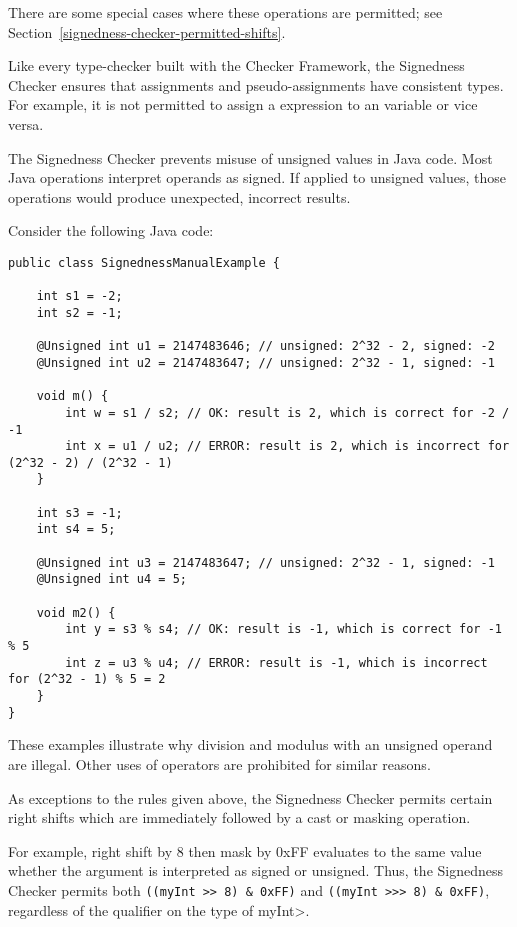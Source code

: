There are some special cases where these operations are permitted; see
Section~\ref{signedness-checker-permitted-shifts}.

Like every type-checker built with the Checker Framework, the Signedness
Checker ensures that assignments and pseudo-assignments have consistent types.
For example, it is not permitted to assign a  expression to an
 variable or vice versa.



The Signedness Checker prevents misuse of unsigned values in Java code.
Most Java operations interpret operands as signed.  If applied to unsigned
values, those operations would produce unexpected, incorrect results.

Consider the following Java code:

\begin{Verbatim}
public class SignednessManualExample {

    int s1 = -2;
    int s2 = -1;

    @Unsigned int u1 = 2147483646; // unsigned: 2^32 - 2, signed: -2
    @Unsigned int u2 = 2147483647; // unsigned: 2^32 - 1, signed: -1

    void m() {
        int w = s1 / s2; // OK: result is 2, which is correct for -2 / -1
        int x = u1 / u2; // ERROR: result is 2, which is incorrect for (2^32 - 2) / (2^32 - 1)
    }

    int s3 = -1;
    int s4 = 5;

    @Unsigned int u3 = 2147483647; // unsigned: 2^32 - 1, signed: -1
    @Unsigned int u4 = 5;

    void m2() {
        int y = s3 % s4; // OK: result is -1, which is correct for -1 % 5
        int z = u3 % u4; // ERROR: result is -1, which is incorrect for (2^32 - 1) % 5 = 2
    }
}
\end{Verbatim}

These examples illustrate why division and modulus with an unsigned operand
are illegal.  Other uses of operators are prohibited for similar reasons.



As exceptions to the rules given above, the Signedness Checker permits
certain right shifts which are immediately followed by a cast or
masking operation.

For example, right shift by 8 then mask by 0xFF evaluates to the same value
whether the argument is interpreted as signed or unsigned.  Thus, the
Signedness Checker permits both \verb|((myInt >> 8) & 0xFF)| and
\verb|((myInt >>> 8) & 0xFF)|, regardless of the qualifier on the type of
\<myInt>.

